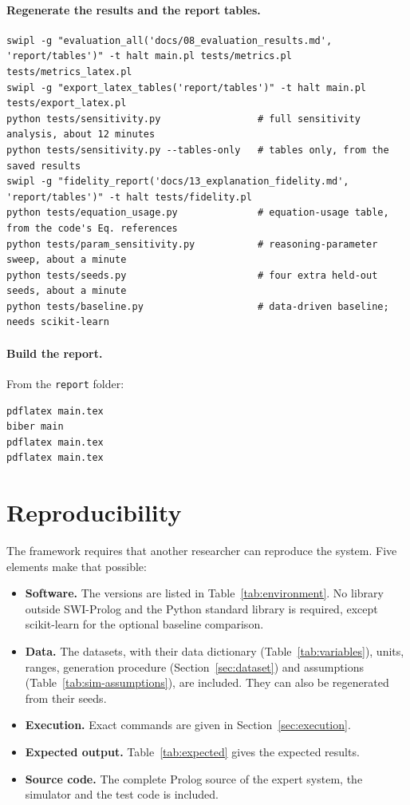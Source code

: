 \paragraph{Regenerate the results and the report tables.}\mbox{}
\begin{lstlisting}[language={}]
swipl -g "evaluation_all('docs/08_evaluation_results.md', 'report/tables')" -t halt main.pl tests/metrics.pl tests/metrics_latex.pl
swipl -g "export_latex_tables('report/tables')" -t halt main.pl tests/export_latex.pl
python tests/sensitivity.py                 # full sensitivity analysis, about 12 minutes
python tests/sensitivity.py --tables-only   # tables only, from the saved results
swipl -g "fidelity_report('docs/13_explanation_fidelity.md', 'report/tables')" -t halt tests/fidelity.pl
python tests/equation_usage.py              # equation-usage table, from the code's Eq. references
python tests/param_sensitivity.py           # reasoning-parameter sweep, about a minute
python tests/seeds.py                       # four extra held-out seeds, about a minute
python tests/baseline.py                    # data-driven baseline; needs scikit-learn
\end{lstlisting}

\paragraph{Build the report.} From the \texttt{report} folder:
\begin{lstlisting}[language={}]
pdflatex main.tex
biber main
pdflatex main.tex
pdflatex main.tex
\end{lstlisting}

\section{Reproducibility}
\label{sec:reproducibility}

The framework requires that another researcher can reproduce the system. Five elements make that possible:

\begin{itemize}
  \item \textbf{Software.} The versions are listed in Table~\ref{tab:environment}. No library outside SWI-Prolog and the Python standard library is required, except scikit-learn for the optional baseline comparison.
  \item \textbf{Data.} The datasets, with their data dictionary (Table~\ref{tab:variables}), units, ranges, generation procedure (Section~\ref{sec:dataset}) and assumptions (Table~\ref{tab:sim-assumptions}), are included. They can also be regenerated from their seeds.
  \item \textbf{Execution.} Exact commands are given in Section~\ref{sec:execution}.
  \item \textbf{Expected output.} Table~\ref{tab:expected} gives the expected results.
  \item \textbf{Source code.} The complete Prolog source of the expert system, the simulator and the test code is included.
\end{itemize}

